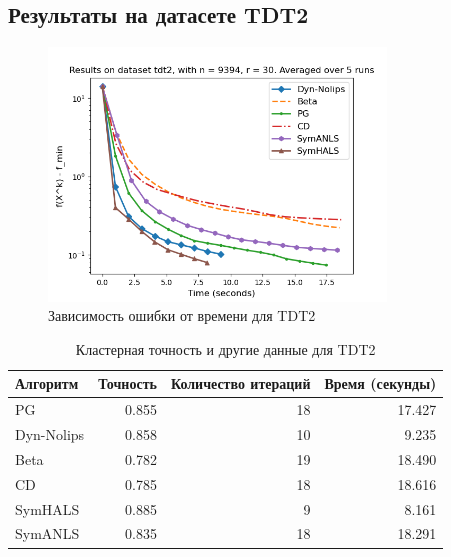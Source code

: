 \documentclass[a4paper,11pt]{article}
\begin{document}
\subsection{Результаты на датасете TDT2}
\begin{figure}[h!]
    \centering \includegraphics[width=0.8\textwidth]{my_plot_tdt2.png}
    \caption{Зависимость ошибки от времени для TDT2}
    \label{fig:tdt2}
\end{figure}
\begin{table}[h!]
    \centering
    \caption{Кластерная точность и другие данные для TDT2}
    \label{tab:clustering_accuracy_tdt2}
    \begin{tabular}{|l|r|r|r|}
        \hline
        Алгоритм & Точность & Количество итераций & Время (секунды) \\
        \hline
        PG & 0.855 & 18 & 17.427 \\
        Dyn-Nolips & 0.858 & 10 & 9.235 \\
        Beta & 0.782 & 19 & 18.490 \\
        CD & 0.785 & 18 & 18.616 \\
        SymHALS & 0.885 & 9 & 8.161 \\
        SymANLS & 0.835 & 18 & 18.291 \\
        \hline
    \end{tabular}
\end{table}
\newpage
\end{document}
